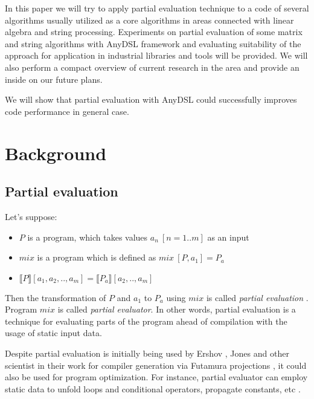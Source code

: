 \documentclass[conference]{IEEEtran}
\begin{document}
In this paper we will try to apply partial evaluation technique to a code of several algorithms usually utilized as a core algorithms in areas connected with linear algebra and string processing. Experiments on partial evaluation of some matrix and string algorithms with AnyDSL \cite{leissa2018anydsl} framework and evaluating suitability of the approach for application in industrial libraries and tools will be provided. We will also perform a compact overview of current research in the area and provide an inside on our future plans.

We will show that partial evaluation with AnyDSL could successfully improves code performance in general case.


\section{Background}

\subsection{Partial evaluation}

Let's suppose:

\begin{itemize}
	\item $P$ is a program, which takes values $a_n\ [n=1..m]$ as an input
	\item $mix$ is a program which is defined as $mix\ [P, a_1] = P_a$
	\item $\llbracket P \rrbracket [a_1, a_2, .., a_m] = \llbracket P_a \rrbracket [a_2, .., a_m]$
\end{itemize}
Then the transformation of $P$ and $a_1$ to $P_a$ using $mix$ is called \textit{partial evaluation} \cite{jones1993partial}. Program $mix$ is called \textit{partial evaluator}. In other words, partial evaluation is a technique for evaluating parts of the program ahead of compilation with the usage of static input data.

Despite partial evaluation is initially being used by Ershov \cite{ershov1982mixed}, Jones \cite{jones1993partial} and other scientist in their work for compiler generation via Futamura projections \cite{futamura1983partial}, it could also be used for program optimization. For instance, partial evaluator can employ static data to unfold loops and conditional operators, propagate constants, etc \cite{jones1993partial}. 
\end{document}
